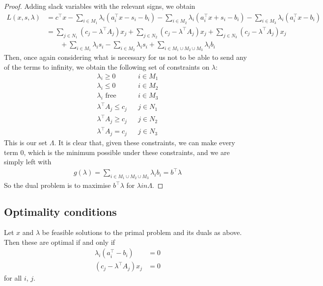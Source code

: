 \documentclass{../../template/note}
\begin{document}
    \begin{proof}
        Adding slack variables with the relevant signs, we obtain
        \begin{align*}
            L(x, s, \lambda) &= c^\intercal x - \sum_{i \in M_1} \lambda_i (a_i^\intercal x - s_i - b_i) - \sum_{i \in M_2} \lambda_i (a_i^\intercal x + s_i - b_i) - \sum_{i \in M_3} \lambda_i (a_i^\intercal x - b_i) \\
            &= \sum_{j \in N_1} (c_j - \lambda^\intercal A_j)x_j + \sum_{j \in N_2} (c_j - \lambda^\intercal A_j)x_j + \sum_{j \in N_3} (c_j - \lambda^\intercal A_j)x_j \\ &\qquad + \sum_{i \in M_1} \lambda_i s_i - \sum_{i \in M_2} \lambda_i s_i + \sum_{i \in M_1 \cup M_2 \cup M_3} \lambda_i b_i
        \end{align*}
        Then, once again considering what is necessary for us not to be able to send any of the terms to infinity, we obtain the following set of constraints on $\lambda$:
        \begin{align*}
            \lambda_i \geq 0 && i \in M_1 \\
            \lambda_i \leq 0 && i \in M_2 \\
            \lambda_i \text{ free} && i \in M_3 \\
            \lambda^\intercal A_j \leq c_j && j \in N_1 \\
            \lambda^\intercal A_j \geq c_j && j \in N_2 \\
            \lambda^\intercal A_j = c_j && j \in N_3
        \end{align*}
        This is our set $\Lambda$. It is clear that, given these constraints, we can make every term 0, which is the minimum possible under these constraints, and we are simply left with
        \begin{align*}
            g(\lambda) = \sum_{i \in M_1 \cup M_2 \cup M_3} \lambda_i b_i = b^\intercal \lambda
        \end{align*}
        So the dual problem is to maximise $b^\intercal \lambda$ for $\lambda in \Lambda$.       
    \end{proof}
    
    \subsection{Optimality conditions}

    \begin{theorem}
        Let $x$ and $\lambda$ be feasible solutions to the primal problem and its duals as above. Then these are optimal if and only if
        \begin{align*}
            \lambda_i (a_i^\intercal - b_i) &= 0 \\
            (c_j - \lambda^\intercal A_j)x_j &= 0
        \end{align*}
        for all $i$, $j$.        
    \end{theorem}
    
\end{document}
